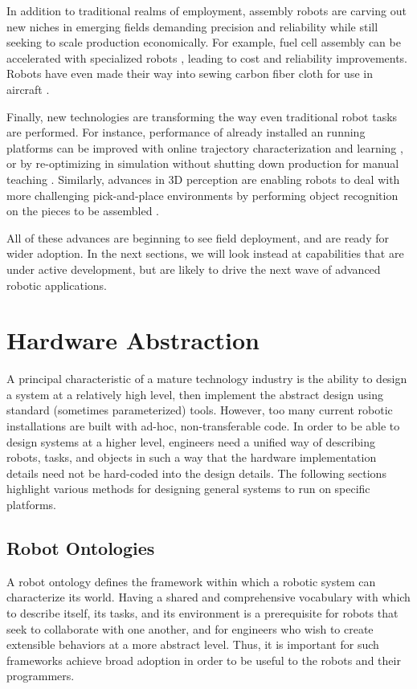In addition to traditional realms of employment, assembly robots are carving out new niches in emerging fields demanding precision and reliability while still seeking to scale production economically. For example, fuel cell assembly can be accelerated with specialized robots \cite{Kuka1}, leading to cost and reliability improvements. Robots have even made their way into sewing carbon fiber cloth for use in aircraft \cite{Kuka2}.

Finally, new technologies are transforming the way even traditional robot tasks are performed. For instance, performance of already installed an running platforms can be improved with online trajectory characterization and learning \cite{Fanuc2}, or by re-optimizing in simulation without shutting down production for manual teaching \cite{Fanuc3}. Similarly, advances in 3D perception are enabling robots to deal with more challenging pick-and-place environments by performing object recognition on the pieces to be assembled \cite{ABB2}.

All of these advances are beginning to see field deployment, and are ready for wider adoption. In the next sections, we will look instead at capabilities that are under active development, but are likely to drive the next wave of advanced robotic applications.

\section{Hardware Abstraction}
\label{sec:abstraction}
A principal characteristic of a mature technology industry is the ability to design a system at a relatively high level, then implement the abstract design using standard (sometimes parameterized) tools. However, too many current robotic installations are built with ad-hoc, non-transferable code. In order to be able to design systems at a higher level, engineers need a unified way of describing robots, tasks, and objects in such a way that the hardware implementation details need not be hard-coded into the design details. The following sections highlight various methods for designing general systems to run on specific platforms.


\subsection{Robot Ontologies}
A robot ontology defines the framework within which a robotic system can characterize its world. Having a shared and comprehensive vocabulary with which to describe itself, its tasks, and its environment is a prerequisite for robots that seek to collaborate with one another, and for engineers who wish to create extensible behaviors at a more abstract level. Thus, it is important for such frameworks achieve broad adoption in order to be useful to the robots and their programmers.

